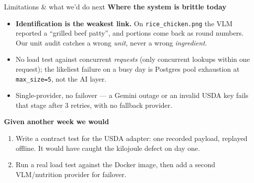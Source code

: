 \documentclass[aspectratio=169,11pt]{beamer}
\begin{document}
\begin{frame}{Limitations \& what we'd do next}
  \textbf{Where the system is brittle today}
  \begin{itemize}\setlength\itemsep{0.3em}
    \item \textbf{Identification is the weakest link.} On \texttt{rice\_chicken.png} the VLM reported a ``grilled beef patty'', and portions come back as round numbers. Our unit audit catches a wrong \emph{unit}, never a wrong \emph{ingredient}.
    \item No load test against concurrent \emph{requests} (only concurrent lookups within one request); the likeliest failure on a busy day is Postgres pool exhaustion at \texttt{max\_size=5}, not the AI layer.
    \item Single-provider, no failover --- a Gemini outage or an invalid USDA key fails that stage after 3 retries, with no fallback provider.
  \end{itemize}

  \vspace{0.4em}
  \textbf{Given another week we would}
  \begin{enumerate}\setlength\itemsep{0.3em}
    \item Write a contract test for the USDA adapter: one recorded payload, replayed offline. It would have caught the kilojoule defect on day one.
    \item Run a real load test against the Docker image, then add a second VLM/nutrition provider for failover.
  \end{enumerate}
\end{frame}
\end{document}
